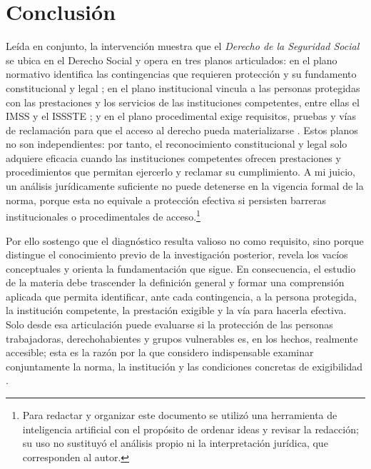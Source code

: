 \documentclass[12pt,letterpaper,oneside]{article}
\begin{document}
\clearpage
\section{Conclusión}

Leída en conjunto, la intervención muestra que el \textit{Derecho de la Seguridad Social} se ubica en el Derecho Social y opera en tres planos articulados: en el plano normativo identifica las contingencias que requieren protección y su fundamento constitucional y legal \citep{cpeum2026,lss2026}; en el plano institucional vincula a las personas protegidas con las prestaciones y los servicios de las instituciones competentes, entre ellas el IMSS y el ISSSTE \citep{imssSitio2026,isssteSitio2026}; y en el plano procedimental exige requisitos, pruebas y vías de reclamación para que el acceso al derecho pueda materializarse \citep{lss2026}. Estos planos no son independientes: por tanto, el reconocimiento constitucional y legal solo adquiere eficacia cuando las instituciones competentes ofrecen prestaciones y procedimientos que permitan ejercerlo y reclamar su cumplimiento. A mi juicio, un análisis jurídicamente suficiente no puede detenerse en la vigencia formal de la norma, porque esta no equivale a protección efectiva si persisten barreras institucionales o procedimentales de acceso.\footnote{Para redactar y organizar este documento se utilizó una herramienta de inteligencia artificial con el propósito de ordenar ideas y revisar la redacción; su uso no sustituyó el análisis propio ni la interpretación jurídica, que corresponden al autor.}

Por ello sostengo que el diagnóstico resulta valioso no como requisito, sino porque distingue el conocimiento previo de la investigación posterior, revela los vacíos conceptuales y orienta la fundamentación que sigue. En consecuencia, el estudio de la materia debe trascender la definición general y formar una comprensión aplicada que permita identificar, ante cada contingencia, a la persona protegida, la institución competente, la prestación exigible y la vía para hacerla efectiva. Solo desde esa articulación puede evaluarse si la protección de las personas trabajadoras, derechohabientes y grupos vulnerables es, en los hechos, realmente accesible; esta es la razón por la que considero indispensable examinar conjuntamente la norma, la institución y las condiciones concretas de exigibilidad \citep{imssSitio2026,isssteSitio2026,lss2026}.

\clearpage
\nocite{unadmSitioWeb,unadmMallaDerecho2024,cpeum2026,lss2026,lissste2026,imssSitio2026,isssteSitio2026,consarSitio2026,normasApaReferencias2020}

\end{document}
